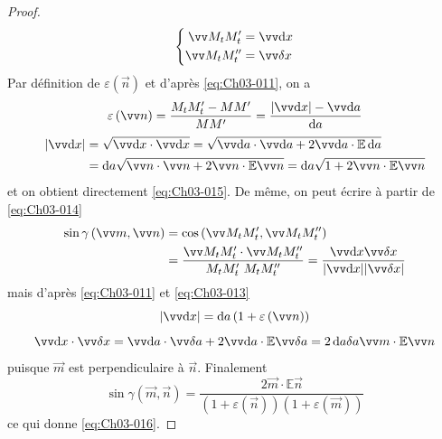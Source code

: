 \begin{proof}
    \[
        \left\{
        \begin{aligned}
            \vec{M_t M_t'} &= \vec{\ud x} \\
            \vec{M_t M_t''} &= \vec{\delta x}
        \end{aligned}
        \right.
    \]
    Par définition de $\varepsilon \left( \vec{n} \right)$ et d'après \eqref{eq:Ch03-011}, on a
    \begin{displaymath}
        \varepsilon \left( \vec{n} \right) = \frac{M_t M_t' - MM'}{MM'} = \frac{|\vec{\ud x}| - \vec{\ud a}}{\ud a}
    \end{displaymath}
    \begin{eqnarray*}
        |\vec{\ud x}| &= \sqrt{\vec{\ud x} \cdot \vec{\ud x}} = \sqrt{\vec{\ud a}\cdot\vec{\ud a} + 2 \vec{\ud a}\cdot \mathbb{E} \ud a} \\
        &= \ud a \sqrt{\vec{n}\cdot\vec{n} + 2\vec{n}\cdot\mathbb{E}\vec{n}} = \ud a \sqrt{1 + 2 \vec{n}\cdot \mathbb{E} \vec{n}}
    \end{eqnarray*}
    et on obtient directement \eqref{eq:Ch03-015}.
    De même, on peut écrire à partir de \eqref{eq:Ch03-014}
    \begin{eqnarray*}
        \sin \gamma \left( \vec{m},\vec{n} \right) &= \cos \left( \vec{M_tM_t'}, \vec{M_tM_t''} \right) \\
        &= \frac{\vec{M_tM_t'}\cdot \vec{M_tM_t''}}{M_t M_t'\ M_t M_t''} = \frac{\vec{\ud x}\vec{\delta x}}{|\vec{\ud x}||\vec{\delta x}|}
    \end{eqnarray*}
    mais d'après \eqref{eq:Ch03-011} et \eqref{eq:Ch03-013}
    \begin{displaymath}
        |\vec{\ud x}| = \ud a \left( 1 + \varepsilon \left( \vec{n} \right) \right)
    \end{displaymath}
    \begin{displaymath}
        \vec{\ud x} \cdot \vec{\delta x} = \vec{\ud a} \cdot \vec{\delta a} + 2 \vec{\ud a}\cdot \mathbb{E} \vec{\delta a} = 2 \ud a \delta a \vec{m} \cdot \mathbb{E} \vec{n}
    \end{displaymath} 
    puisque $\vec{m}$ est perpendiculaire à $\vec{n}$.
    Finalement
    \begin{displaymath}
        \sin \gamma \left( \vec{m}, \vec{n} \right) = \frac{2\vec{m}\cdot \mathbb{E} \vec{n}}{\left( 1 + \varepsilon \left( \vec{n} \right) \right)\left( 1 + \varepsilon \left( \vec{m} \right) \right)}
    \end{displaymath}
    ce qui donne \eqref{eq:Ch03-016}.
\end{proof}

